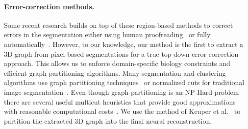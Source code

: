 \paragraph{Error-correction methods.}
Some recent research builds on top of these region-based methods to correct errors in the segmentation either using human proofreading~\cite{raveler,mojo2,haehn_dojo_2014,haehn2017guided} or fully automatically~\cite{rolnick2017morphological,error_correction_using_CNN}.
However, to our knowledge, our method is the first to extract a 3D graph from pixel-based segmentations for a true top-down error correction approach. This allows us to enforce domain-specific biology constraints and efficient graph partitioning algorithms. Many segmentation and clustering algorithms use graph partitioning techniques~\cite{andres2012globally} or normalized cuts for traditional image segmentation~\cite{kappes2016higher,shi2000normalized,tatiraju2008image}.
Even though graph partitioning is an NP-Hard problem~\cite{demaine2006correlation} there are several useful multicut heuristics that provide good approximations with reasonable computational costs~\cite{horvnakova2017analysis}. We use the method of Keuper et al.~\cite{keuper2015efficient} to partition the extracted 3D graph into the final neural reconstruction.
